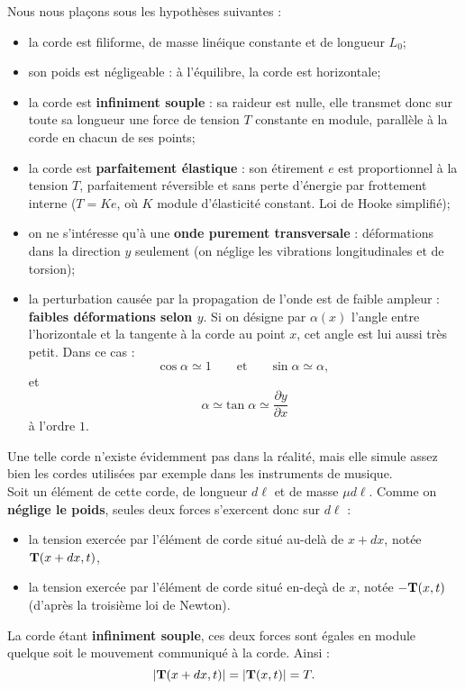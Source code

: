 \documentclass[11pt,a4paper]{report}
\begin{document}
Nous nous plaçons sous les hypothèses suivantes :
\begin{itemize}
	\item la corde est filiforme, de masse linéique constante et de longueur $L_0$;
	\item son poids est négligeable : à l'équilibre, la corde est horizontale;
	\item la corde est \textbf{infiniment souple} : sa raideur est nulle, elle transmet donc sur toute sa longueur une force de tension $T$ constante en module, parallèle à la corde en chacun de ses points;
	\item la corde est \textbf{parfaitement élastique} : son étirement $e$ est proportionnel à la tension $T$, parfaitement réversible et sans perte d'énergie par frottement interne 
	($T = Ke$, où $K$ module d'élasticité constant. Loi de Hooke simplifié);	
	\item on ne s'intéresse qu'à une \textbf{onde purement transversale} : déformations dans la direction $y$ seulement (on néglige les vibrations longitudinales et de torsion);
	\item la perturbation causée par la propagation de l'onde est de faible ampleur : \textbf{faibles déformations selon $y$}. Si on désigne par $\alpha(x)$ l'angle entre l'horizontale et la tangente à la corde au point $x$, cet angle est lui aussi très petit. Dans ce cas :
	\begin{equation}
		\text{cos}\;\alpha \simeq 1 \qquad\text{et}\qquad \text{sin}\;\alpha \simeq \alpha,
	\end{equation}
	et
	\begin{equation}
		\alpha \simeq \text{tan}\;\alpha \simeq \frac{\partial y}{\partial x}
	\end{equation}
	à l'ordre $1$.
\end{itemize}
Une telle corde n'existe évidemment pas dans la réalité, mais elle simule assez bien les cordes utilisées par exemple dans les instruments de musique.\\

Soit un élément de cette corde, de longueur $d\ell$ et de masse $\mu d\ell$. Comme on \textbf{néglige le poids}, seules deux forces s'exercent donc sur $d\ell$ :
\begin{itemize}
	\item la tension exercée par l'élément de corde situé au-delà de $x+dx$, notée $\bold{T}(x+dx,t)$,
	\item la tension exercée par l'élément de corde situé en-deçà de $x$, notée $-\bold{T}(x,t)$ (d'après la troisième loi de Newton).
\end{itemize}
La corde étant \textbf{infiniment souple}, ces deux forces sont égales en module quelque soit le mouvement communiqué à la corde. Ainsi :
\begin{equation}
	|\bold{T}(x+dx,t)| = |\bold{T}(x,t)| = T. 
\end{equation} 
\end{document}
